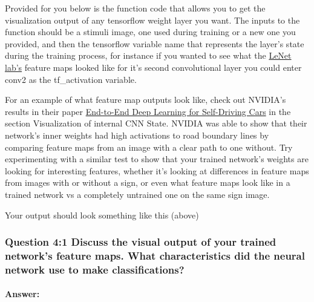 \documentclass[11pt]{article}
\begin{document}
Provided for you below is the function code that allows you to get the
visualization output of any tensorflow weight layer you want. The inputs
to the function should be a stimuli image, one used during training or a
new one you provided, and then the tensorflow variable name that
represents the layer's state during the training process, for instance
if you wanted to see what the
\href{https://classroom.udacity.com/nanodegrees/nd013/parts/fbf77062-5703-404e-b60c-95b78b2f3f9e/modules/6df7ae49-c61c-4bb2-a23e-6527e69209ec/lessons/601ae704-1035-4287-8b11-e2c2716217ad/concepts/d4aca031-508f-4e0b-b493-e7b706120f81}{LeNet
lab's} feature maps looked like for it's second convolutional layer you
could enter conv2 as the tf\_activation variable.

For an example of what feature map outputs look like, check out NVIDIA's
results in their paper
\href{https://devblogs.nvidia.com/parallelforall/deep-learning-self-driving-cars/}{End-to-End
Deep Learning for Self-Driving Cars} in the section Visualization of
internal CNN State. NVIDIA was able to show that their network's inner
weights had high activations to road boundary lines by comparing feature
maps from an image with a clear path to one without. Try experimenting
with a similar test to show that your trained network's weights are
looking for interesting features, whether it's looking at differences in
feature maps from images with or without a sign, or even what feature
maps look like in a trained network vs a completely untrained one on the
same sign image.

Your output should look something like this (above)

    \subsubsection{Question 4:1 Discuss the visual output of your trained
network's feature maps. What characteristics did the neural network use
to make
classifications?}\label{question-41-discuss-the-visual-output-of-your-trained-networks-feature-maps.-what-characteristics-did-the-neural-network-use-to-make-classifications}

    \paragraph{Answer:}\label{answer}
\end{document}
